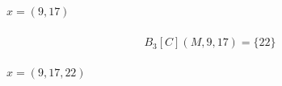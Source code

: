 \begin{minipage}[t]{8cm}
    \begin{minipage}{4cm}
        \centering
        \vspace{0.7mm}
        $x=(9,17)$
        \begin{graybox}
            \setlength{\abovedisplayskip}{0pt}
            \setlength{\belowdisplayskip}{0pt}
            \vspace{-0.5em}
            \begin{gather*}
                \\[-3.75mm]
                B_3[C](M,9,17)=\{22\}
                \\[-3.75mm]
            \end{gather*}
        \end{graybox}
        \vspace{-0.75em}
        {\Huge{}}
    \end{minipage}

    \vspace{0.5mm}
    {\large $x=(9,17,22)$}
\end{minipage}